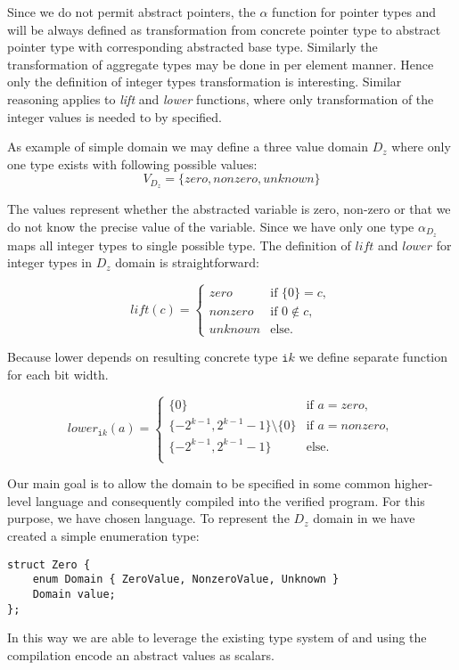 Since we do not permit abstract pointers, the $\alpha$ function for pointer types and will be
always defined as transformation from concrete pointer type to abstract pointer
type with corresponding abstracted base type. Similarly the transformation of
aggregate types may be done in per element manner. Hence only the definition of
integer types transformation is interesting. Similar reasoning applies to
\textit{lift} and \textit{lower} functions, where only transformation of the
integer values is needed to by specified.

As example of simple domain we may define a three value domain $D_z$ where only
one type exists with following possible values:
\[ V_{D_z} = \{ \textit{zero}, \textit{nonzero}, \textit{unknown} \}\]


The values represent whether the abstracted variable is zero, non-zero or that we do
not know the precise value of the variable. Since we have only one type
$\alpha_{D_z}$ maps all integer types to single possible type.
The definition of $\textit{lift}$ and $\textit{lower}$ for integer
types in $D_z$ domain is straightforward:

\[
  lift(c) =
  \begin{cases}
    \textit{zero}    & \text{if } \{0\} = c, \\
    \textit{nonzero} & \text{if } 0 \not \in c, \\
    \textit{unknown} & \text{else.}
  \end{cases}
\]

\noindent
Because lower depends on resulting concrete type $\texttt{i}k$ we define separate
function for each bit width.

\[
  lower_{\texttt{i}k}(a) =
  \begin{cases}
    \{0\}    & \text{if } a = \textit{zero},\\
    \{-2^{k-1}, 2^{k - 1} - 1\} \setminus \{0\} & \text{if } a = \textit{nonzero}, \\
    \{-2^{k-1}, 2^{k - 1} - 1\} & \text{else}. \\
  \end{cases}
\]

Our main goal is to allow the domain to be specified in some common higher-level
language and consequently compiled into the verified program. For this purpose,
we have chosen \Cpp{} language. To represent the $D_z$ domain in
\Cpp{} we have created a simple enumeration type:
\begin{verbatim}
struct Zero {
    enum Domain { ZeroValue, NonzeroValue, Unknown }
    Domain value;
};
\end{verbatim}
In this way we are able to leverage the existing type system of \LLVM and
using the compilation encode an abstract values as \LLVM scalars.

